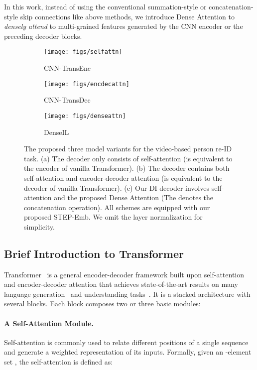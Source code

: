 \documentclass[10pt,twocolumn,letterpaper]{article}
\begin{document}
In this work, instead of using the conventional summation-style or concatenation-style skip connections like above methods, we introduce Dense Attention to \emph{densely attend} to multi-grained features generated by the CNN encoder or the preceding decoder blocks.

\begin{figure*}
	\centering
	\begin{subfigure}{.3\textwidth}
		\centering
		\texttt{[image: figs/selfattn]}
		\caption{CNN-TransEnc}
		\label{fig:transenc}
	\end{subfigure}
	\begin{subfigure}{.3\textwidth}
		\centering
		\texttt{[image: figs/encdecattn]}
		\caption{CNN-TransDec}
		\label{fig:transdec}
	\end{subfigure}
	\begin{subfigure}{.357\textwidth}
		\centering
		\texttt{[image: figs/denseattn]}
		\caption{DenseIL}
		\label{fig:densetrans}
	\end{subfigure}
	\caption{The proposed three model variants for the video-based person re-ID task. (a) The decoder only consists of self-attention (is equivalent to the encoder of vanilla Transformer). (b) The decoder contains both self-attention and encoder-decoder attention (is equivalent to the decoder of vanilla Transformer). (c) Our DI decoder involves self-attention and the proposed Dense Attention (The  denotes the concatenation operation). All schemes are equipped with our proposed STEP-Emb. We omit the layer normalization for simplicity.}
	\vspace{-3mm}
	\label{fig:attndiff}
\end{figure*}

\subsection{Brief Introduction to Transformer}
\label{sec:transformer}

Transformer~\cite{vaswani2017attention} is a general encoder-decoder framework built upon self-attention and encoder-decoder attention that achieves state-of-the-art results on many language generation~\cite{he2018layer,wang2019multi,xia2019tied} and understanding tasks~\cite{devlin2019bert,yang2019xlnet}. It is a stacked architecture with several blocks. Each block composes two or three basic modules:

\vspace{-2mm}
\paragraph{A Self-Attention Module.}
Self-attention is commonly used to relate different positions of a single sequence and generate a weighted representation of its inputs. Formally, given an -element set , the self-attention is defined as:
\end{document}
